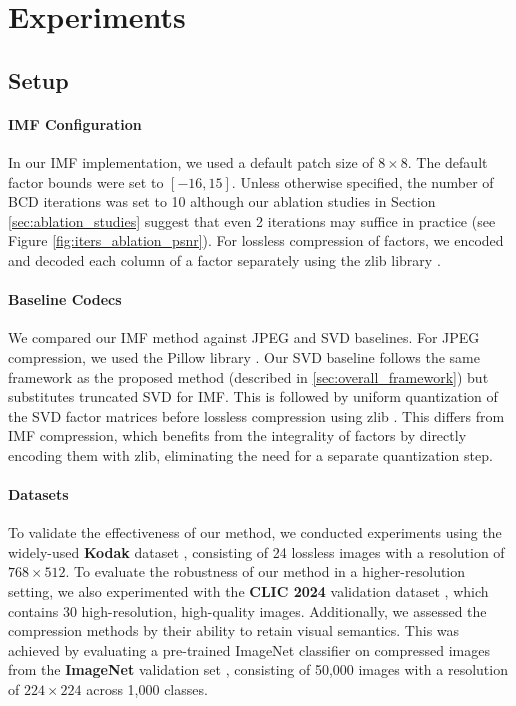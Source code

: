 \section{Experiments} \label{sec:experiments}

\subsection{Setup} \label{sec:setup}

\paragraph{IMF Configuration}
In our IMF implementation, we used a default patch size of $8 \times 8$. The default factor bounds were set to $[-16, 15]$. Unless otherwise specified, the number of BCD iterations was set to 10 although our ablation studies in Section \ref{sec:ablation_studies} suggest that even 2 iterations may suffice in practice (see Figure \ref{fig:iters_ablation_psnr}). For lossless compression of factors, we encoded and decoded each column of a factor separately using the zlib library \cite{deutsch1996zlib}. 

\paragraph{Baseline Codecs}
We compared our IMF method against JPEG and SVD baselines. For JPEG compression, we used the Pillow library \cite{clark2015pillow}. Our SVD baseline follows the same framework as the proposed method (described in \ref{sec:overall_framework}) but substitutes truncated SVD for IMF. This is followed by uniform quantization of the SVD factor matrices before lossless compression using zlib \cite{deutsch1996zlib}. This differs from IMF compression, which benefits from the integrality of factors by directly encoding them with zlib, eliminating the need for a separate quantization step.

\paragraph{Datasets}
To validate the effectiveness of our method, we conducted experiments using the widely-used \textbf{Kodak} dataset \cite{kodak1993}, consisting of 24 lossless images with a resolution of $768 \times 512$. To evaluate the robustness of our method in a higher-resolution setting, we also experimented with the \textbf{CLIC 2024} validation dataset \cite{clic2024}, which contains 30 high-resolution, high-quality images. Additionally, we assessed the compression methods by their ability to retain visual semantics. This was achieved by evaluating a pre-trained ImageNet classifier on compressed images from the \textbf{ImageNet} validation set \cite{russakovsky2015imagenet}, consisting of 50,000 images with a resolution of $224 \times 224$ across 1,000 classes.

